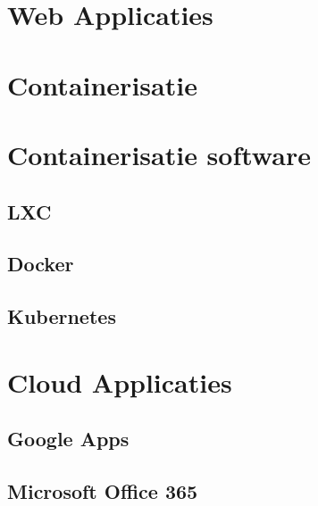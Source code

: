 \documentclass[a4paper,12pt,twoside,openright,titlepage]{book}
\begin{document}
\section{Web Applicaties}
\section{Containerisatie}
\section{Containerisatie software}
\subsection{LXC}
\subsection{Docker}
\subsection{Kubernetes}
\section{Cloud Applicaties}
\subsection{Google Apps}
\subsection{Microsoft Office 365}

\printindex
\end{document}
